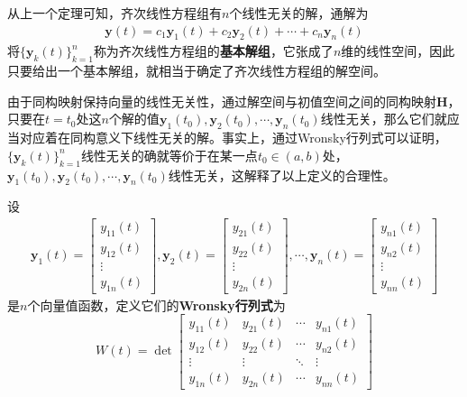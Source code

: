 从上一个定理可知，齐次线性方程组有$n$个线性无关的解，通解为\begin{align*}
    \mathbf{y}(t)=c_1\mathbf{y}_1(t)+c_2\mathbf{y}_2(t)+\cdots+c_n\mathbf{y}_n(t)
\end{align*}
将$\{\mathbf{y}_k(t)\}_{k=1}^n$称为齐次线性方程组的\textbf{基本解组}，它张成了$n$维的线性空间，因此只要给出一个基本解组，就相当于确定了齐次线性方程组的解空间。

由于同构映射保持向量的线性无关性，通过解空间与初值空间之间的同构映射$\mathbf{H}$，只要在$t=t_0$处这$n$个解的值$\mathbf{y}_1(t_0),\mathbf{y}_2(t_0),\cdots,\mathbf{y}_n(t_0)$线性无关，那么它们就应当对应着在同构意义下线性无关的解。事实上，通过Wronsky行列式可以证明，$\{\mathbf{y}_k(t)\}_{k=1}^n$线性无关的确就等价于在某一点$t_0\in(a,b)$处，$\mathbf{y}_1(t_0),\mathbf{y}_2(t_0),\cdots,\mathbf{y}_n(t_0)$线性无关，这解释了以上定义的合理性。

\begin{definition}[Wronsky行列式]
    设\begin{align*}
    \mathbf{y}_1(t)=\begin{bmatrix}
    y_{11}(t)\\
    y_{12}(t)\\
    \vdots\\
    y_{1n}(t)
    \end{bmatrix},\mathbf{y}_2(t)=\begin{bmatrix}
    y_{21}(t)\\
    y_{22}(t)\\
    \vdots\\
    y_{2n}(t)
    \end{bmatrix},\cdots,\mathbf{y}_n(t)=\begin{bmatrix}
    y_{n1}(t)\\
    y_{n2}(t)\\
    \vdots\\
    y_{nn}(t)
    \end{bmatrix}
    \end{align*}
    是$n$个向量值函数，定义它们的\textbf{Wronsky行列式}为
    \[W(t)=\det\begin{bmatrix}
    y_{11}(t) & y_{21}(t) & \cdots & y_{n1}(t)\\
    y_{12}(t) & y_{22}(t) & \cdots & y_{n2}(t)\\
    \vdots & \vdots & \ddots & \vdots\\
    y_{1n}(t) & y_{2n}(t) & \cdots & y_{nn}(t)
    \end{bmatrix}\]
\end{definition}

